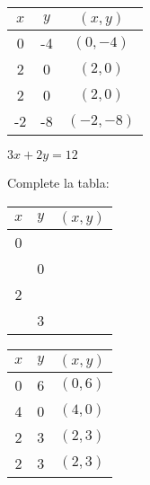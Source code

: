 \begin{exercise}
\begin{solucion}
\begin{tabular}{|c|c|c|}
\hline
$x$ & $y$ & $(x, y)$ \\
\hline
0 & -4 & $(0, -4)$ \\
\hline
2 & 0 & $(2, 0)$ \\
\hline
2 & 0 & $(2, 0)$ \\
\hline
-2 & -8 & $(-2, -8)$ \\
\hline
\end{tabular}
\end{solucion}

\problem $3x + 2y = 12$

Complete la tabla:
\begin{center}
\begin{tabular}{|c|c|c|}
\hline
$x$ & $y$ & $(x, y)$ \\
\hline
0 & & \\
\hline
& 0 & \\
\hline
2 & & \\
\hline
& 3 & \\
\hline
\end{tabular}
\end{center}

\begin{solucion}
\begin{tabular}{|c|c|c|}
\hline
$x$ & $y$ & $(x, y)$ \\
\hline
0 & 6 & $(0, 6)$ \\
\hline
4 & 0 & $(4, 0)$ \\
\hline
2 & 3 & $(2, 3)$ \\
\hline
2 & 3 & $(2, 3)$ \\
\hline
\end{tabular}
\end{solucion}
\end{exercise}


